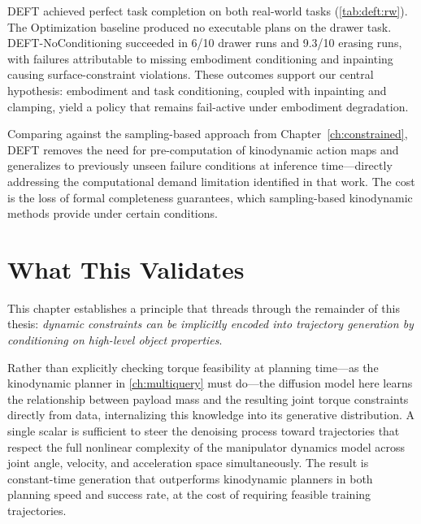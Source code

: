 \textsc{DEFT} achieved perfect task completion on both real-world tasks (\cref{tab:deft:rw}). The Optimization baseline produced no executable plans on the drawer task. \textsc{DEFT}-NoConditioning succeeded in 6/10 drawer runs and 9.3/10 erasing runs, with failures attributable to missing embodiment conditioning and inpainting causing surface-constraint violations. These outcomes support our central hypothesis: embodiment and task conditioning, coupled with inpainting and clamping, yield a policy that remains fail-active under embodiment degradation.

Comparing against the sampling-based approach from Chapter~\ref{ch:constrained}, DEFT removes the need for pre-computation of kinodynamic action maps and generalizes to previously unseen failure conditions at inference time---directly addressing the computational demand limitation identified in that work. The cost is the loss of formal completeness guarantees, which sampling-based kinodynamic methods provide under certain conditions.

\section{What This Validates}
\label{sec:payload:validation}

This chapter establishes a principle that threads through the remainder of this thesis: \textit{dynamic constraints can be implicitly encoded into trajectory generation by conditioning on high-level object properties}.

Rather than explicitly checking torque feasibility at planning time---as the kinodynamic planner in \cref{ch:multiquery} must do---the diffusion model here learns the relationship between payload mass and the resulting joint torque constraints directly from data, internalizing this knowledge into its generative distribution.
A single scalar is sufficient to steer the denoising process toward trajectories that respect the full nonlinear complexity of the manipulator dynamics model across joint angle, velocity, and acceleration space simultaneously.
The result is constant-time generation that outperforms kinodynamic planners in both planning speed and success rate, at the cost of requiring feasible training trajectories.

